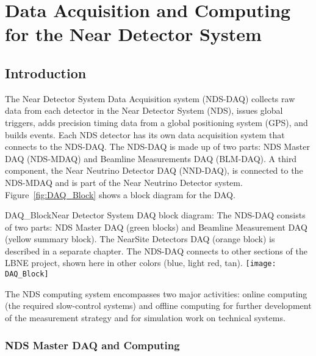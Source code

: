 \chapter{Data Acquisition and Computing for the Near Detector System} %
\label{ch:nd-gdaq}

\section{Introduction}
\label{sec:nd-gdaq-intro}

The Near Detector System Data Acquisition system (NDS-DAQ) collects raw data from each detector 
in the Near Detector System (NDS), issues global  triggers, adds precision timing 
data from a global positioning system (GPS), and builds events. Each NDS detector has its 
own data acquisition system that connects to the NDS-DAQ.
The NDS-DAQ is made up of two parts: NDS Master DAQ (NDS-MDAQ) and Beamline Measurements 
DAQ (BLM-DAQ). A third component, the Near Neutrino Detector DAQ (NND-DAQ), is 
connected to the NDS-MDAQ and is part of the Near Neutrino Detector system.
Figure~\ref{fig:DAQ_Block} shows a block diagram for the DAQ.

\begin{cdrfigure}{DAQ_Block}{Near Detector System DAQ block diagram: The NDS-DAQ consists 
of two parts: NDS Master DAQ (green blocks) and Beamline Measurement DAQ (yellow summary 
block). The NearSite Detectors DAQ (orange block) is described in a separate chapter. The 
NDS-DAQ connects to other sections of the LBNE project, shown here in other colors (blue, 
light red, tan).}
\texttt{[image: DAQ\_Block]}
\end{cdrfigure}

The NDS computing system encompasses two major activities: online computing (the required
slow-control systems) and offline computing for further development of the measurement strategy and for simulation work on technical systems.

\subsection{NDS Master DAQ and Computing}
\label{sec:nd-master-daq}

